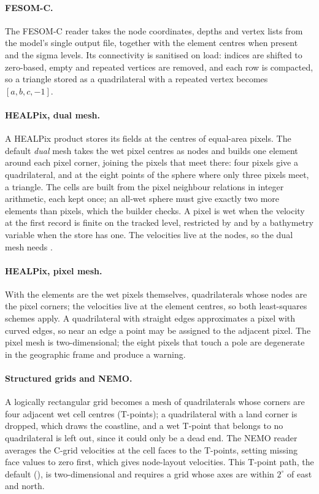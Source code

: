 \paragraph{FESOM-C.} The FESOM-C reader takes the node coordinates, depths and vertex lists from the
model's single output file, together with the element centres when present and the sigma levels. Its
connectivity is sanitised on load: indices are shifted to zero-based, empty and repeated vertices are
removed, and each row is compacted, so a triangle stored as a quadrilateral with a repeated vertex
becomes $[a,b,c,-1]$.

\paragraph{HEALPix, dual mesh.} A HEALPix product stores its fields at the centres of equal-area pixels.
The default \emph{dual} mesh takes the wet pixel centres as nodes and builds one element around each pixel
corner, joining the pixels that meet there: four pixels give a quadrilateral, and at the eight points of
the sphere where only three pixels meet, a triangle. The cells are built from the pixel neighbour
relations in integer arithmetic, each kept once; an all-wet sphere must give exactly two more elements than
pixels, which the builder checks. A pixel is wet when the velocity at the first record is finite on the
tracked level, restricted by  and by a bathymetry variable when the store has one.
The velocities live at the nodes, so the dual mesh needs .

\paragraph{HEALPix, pixel mesh.} With  the elements are the wet pixels
themselves, quadrilaterals whose nodes are the pixel corners; the velocities live at the element centres,
so both least-squares schemes apply. A quadrilateral with straight edges approximates a pixel with curved
edges, so near an edge a point may be assigned to the adjacent pixel. The pixel mesh is two-dimensional;
the eight pixels that touch a pole are degenerate in the geographic frame and produce a warning.

\paragraph{Structured grids and NEMO.} A logically rectangular grid becomes a mesh of quadrilaterals whose
corners are four adjacent wet cell centres (T-points); a quadrilateral with a land corner is dropped, which
draws the coastline, and a wet T-point that belongs to no quadrilateral is left out, since it could only be
a dead end. The NEMO reader averages the C-grid velocities at the cell faces to the T-points, setting
missing face values to zero first, which gives node-layout velocities. This T-point path, the default
(), is two-dimensional and requires a grid whose axes are within $2^\circ$
of east and north.

